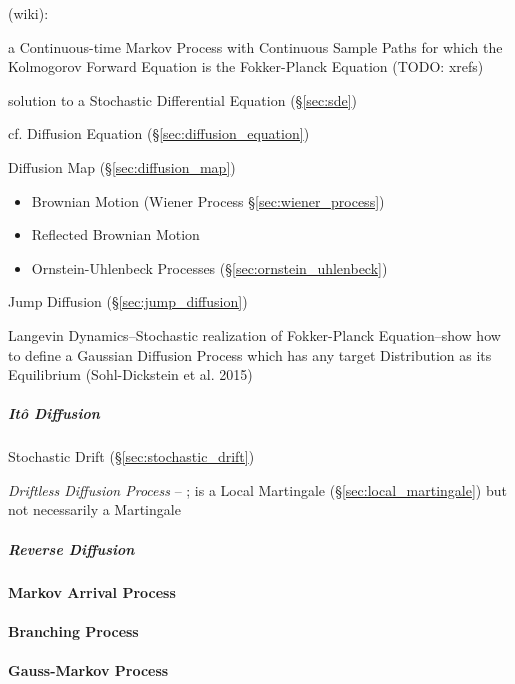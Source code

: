 (wiki):

a Continuous-time Markov Process with Continuous Sample Paths for which the
Kolmogorov Forward Equation is the Fokker-Planck Equation (TODO: xrefs)

solution to a Stochastic Differential Equation (\S\ref{sec:sde})

cf. Diffusion Equation (\S\ref{sec:diffusion_equation})

\fist Diffusion Map (\S\ref{sec:diffusion_map})

\begin{itemize}
  \item Brownian Motion (Wiener Process \S\ref{sec:wiener_process})
  \item Reflected Brownian Motion
  \item Ornstein-Uhlenbeck Processes (\S\ref{sec:ornstein_uhlenbeck})
\end{itemize}

Jump Diffusion (\S\ref{sec:jump_diffusion})

Langevin Dynamics--Stochastic realization of Fokker-Planck Equation--show how to
define a Gaussian Diffusion Process which has any target Distribution as its
Equilibrium (Sohl-Dickstein et al. 2015)



\subparagraph{It\^o Diffusion}\label{sec:ito_diffusion}\hfill

Stochastic Drift (\S\ref{sec:stochastic_drift})

\emph{Driftless Diffusion Process} -- ; is a Local Martingale
(\S\ref{sec:local_martingale}) but not necessarily a Martingale



\subparagraph{Reverse Diffusion}\label{sec:reverse_diffusion}\hfill



\paragraph{Markov Arrival Process}\label{sec:markov_arrival_process}\hfill

\paragraph{Branching Process}\label{sec:branching_process}\hfill

\paragraph{Gauss-Markov Process}\label{sec:gauss_markov_process}\hfill

